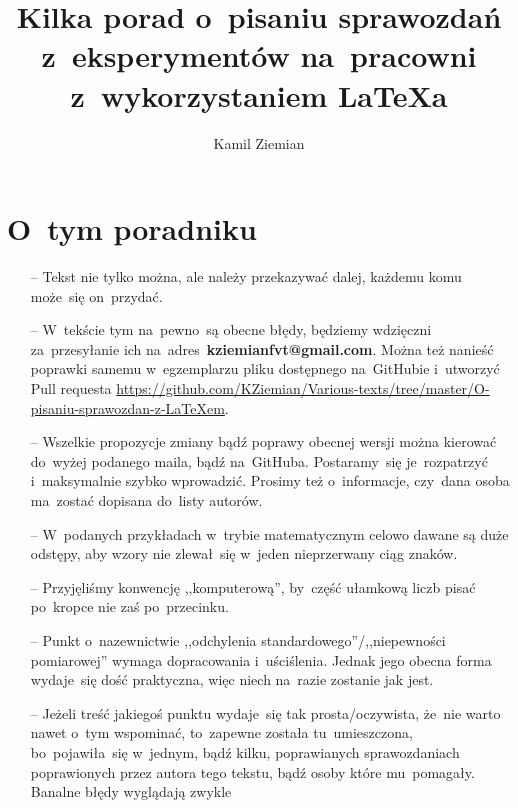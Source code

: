 \documentclass[a4paper,11pt]{article}
\title{Kilka porad o~pisaniu sprawozdań z~eksperymentów na~pracowni
  z~wykorzystaniem \LaTeX a}
\author{Kamil Ziemian}
\newcommand{\tb}{\textbf}
\begin{document}


\maketitle



\section*{O~tym poradniku}
\label{sec:otym}


\begin{itemize}
\item[--] Tekst nie tylko można, ale należy przekazywać dalej, każdemu
  komu może~się on~przydać.
\item[--] W~tekście tym na~pewno~są obecne błędy, będziemy wdzięczni
  za~przesyłanie ich na~adres~\tb{kziemianfvt@gmail.com}. Można też
  nanieść poprawki samemu w~egzemplarzu pliku dostępnego na~GitHubie
  i~utworzyć Pull requesta
  \href{https://github.com/KZiemian/Various-texts/tree/master/O-pisaniu-sprawozdan-z-LaTeXem}{https://github.com/KZiemian/Various-texts/tree/master/O-pisaniu-sprawozdan-z-LaTeXem}.
\item[--] Wszelkie propozycje zmiany bądź poprawy obecnej wersji można
  kierować do~wyżej podanego maila, bądź na~GitHuba. Postaramy~się
  je~rozpatrzyć i~maksymalnie szybko wprowadzić. Prosimy też
  o~informacje, czy~dana osoba ma~zostać dopisana do~listy autorów.
\item[--] W~podanych przykładach w~trybie matematycznym celowo dawane
  są duże odstępy, aby wzory nie zlewał~się w~jeden nieprzerwany ciąg
  znaków.
\item[--] Przyjęliśmy konwencję ,,komputerową'', by~część ułamkową
  liczb pisać po~kropce nie zaś po~przecinku.
\item[--] Punkt o~nazewnictwie ,,odchylenia
  standardowego''/,,niepewności pomiarowej'' wymaga dopracowania
  i~uściślenia. Jednak jego obecna forma wydaje~się dość praktyczna,
  więc niech na~razie zostanie jak jest.
\item[--] Jeżeli treść jakiegoś punktu wydaje~się tak
  prosta/oczywista, że~nie warto nawet o~tym wspominać, to~zapewne
  została tu~umieszczona, bo~pojawiła~się w~jednym, bądź kilku,
  poprawianych sprawozdaniach poprawionych przez autora tego tekstu,
  bądź osoby które mu~pomagały. Banalne błędy wyglądają zwykle

\end{itemize}
\end{document}
